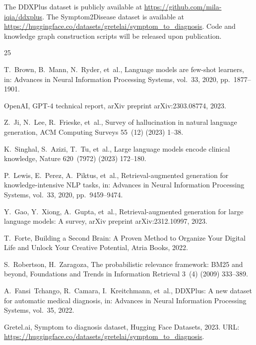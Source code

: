 \documentclass[review]{elsarticle}
\begin{document}
The DDXPlus dataset is publicly available at \url{https://github.com/mila-iqia/ddxplus}. The Symptom2Disease dataset is available at \url{https://huggingface.co/datasets/gretelai/symptom_to_diagnosis}. Code and knowledge graph construction scripts will be released upon publication.



\begin{thebibliography}{25}

T.~Brown, B.~Mann, N.~Ryder, et~al., Language models are few-shot learners, in: Advances in Neural Information Processing Systems, vol.~33, 2020, pp.~1877--1901.

OpenAI, GPT-4 technical report, arXiv preprint arXiv:2303.08774, 2023.

Z.~Ji, N.~Lee, R.~Frieske, et~al., Survey of hallucination in natural language generation, ACM Computing Surveys 55~(12) (2023) 1--38.

K.~Singhal, S.~Azizi, T.~Tu, et~al., Large language models encode clinical knowledge, Nature 620~(7972) (2023) 172--180.

P.~Lewis, E.~Perez, A.~Piktus, et~al., Retrieval-augmented generation for knowledge-intensive NLP tasks, in: Advances in Neural Information Processing Systems, vol.~33, 2020, pp.~9459--9474.

Y.~Gao, Y.~Xiong, A.~Gupta, et~al., Retrieval-augmented generation for large language models: A survey, arXiv preprint arXiv:2312.10997, 2023.

T.~Forte, Building a Second Brain: A Proven Method to Organize Your Digital Life and Unlock Your Creative Potential, Atria Books, 2022.

S.~Robertson, H.~Zaragoza, The probabilistic relevance framework: BM25 and beyond, Foundations and Trends in Information Retrieval 3~(4) (2009) 333--389.

A.~Fansi~Tchango, R.~Camara, I.~Kreitchmann, et~al., DDXPlus: A new dataset for automatic medical diagnosis, in: Advances in Neural Information Processing Systems, vol.~35, 2022.

Gretel.ai, Symptom to diagnosis dataset, Hugging Face Datasets, 2023. URL: \url{https://huggingface.co/datasets/gretelai/symptom_to_diagnosis}.


\end{thebibliography}
\end{document}
